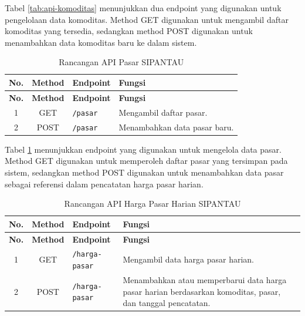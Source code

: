 Tabel \ref{tab:api-komoditas} menunjukkan dua endpoint yang digunakan untuk pengelolaan data komoditas. Method GET digunakan untuk mengambil daftar komoditas yang tersedia, sedangkan method POST digunakan untuk menambahkan data komoditas baru ke dalam sistem.

\begin{longtable}{|c|c|p{3.2cm}|p{6cm}|}
\caption{Rancangan API Pasar SIPANTAU}
\label{tab:api-pasar} \\

\hline
\textbf{No.} & \textbf{Method} & \textbf{Endpoint} & \textbf{Fungsi} \\
\hline
\endfirsthead

\hline
\textbf{No.} & \textbf{Method} & \textbf{Endpoint} & \textbf{Fungsi} \\
\hline
\endhead

1 & GET & \texttt{/pasar} &
Mengambil daftar pasar. \\ \hline

2 & POST & \texttt{/pasar} &
Menambahkan data pasar baru. \\ \hline

\end{longtable}

Tabel \ref{tab:api-pasar} menunjukkan endpoint yang digunakan untuk mengelola data pasar. Method GET digunakan untuk memperoleh daftar pasar yang tersimpan pada sistem, sedangkan method POST digunakan untuk menambahkan data pasar sebagai referensi dalam pencatatan harga pasar harian.

\begin{longtable}{|c|c|p{3.2cm}|p{6cm}|}
\caption{Rancangan API Harga Pasar Harian SIPANTAU}
\label{tab:api-harga-pasar} \\

\hline
\textbf{No.} & \textbf{Method} & \textbf{Endpoint} & \textbf{Fungsi} \\
\hline
\endfirsthead

\hline
\textbf{No.} & \textbf{Method} & \textbf{Endpoint} & \textbf{Fungsi} \\
\hline
\endhead

1 & GET & \texttt{/harga-pasar} &
Mengambil data harga pasar harian. \\ \hline

2 & POST & \texttt{/harga-pasar} &
Menambahkan atau memperbarui data harga pasar harian berdasarkan komoditas, pasar, dan tanggal pencatatan. \\ \hline

\end{longtable}


